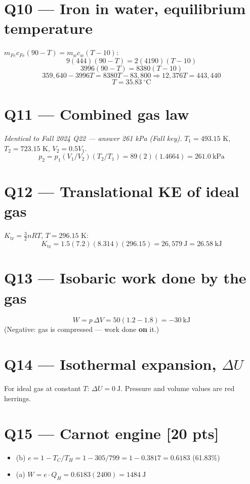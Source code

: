 \documentclass[11pt]{article}
\begin{document}
\section*{Q10 --- Iron in water, equilibrium temperature}
$m_{Fe}c_{Fe}(90-T) = m_w c_w(T-10)$:
\[ 9(444)(90-T) = 2(4190)(T-10) \]
\[ 3996(90-T) = 8380(T-10) \]
\[ 359{,}640 - 3996T = 8380T - 83{,}800 \Rightarrow 12{,}376T = 443{,}440 \]
\[ T = \boxed{35.83\ ^\circ\text{C}} \]

\section*{Q11 --- Combined gas law}
\emph{Identical to Fall 2024 Q22 --- answer 261 kPa (Fall key).} $T_1=493.15$ K, $T_2=723.15$ K, $V_2=0.5V_1$.
\[ p_2 = p_1(V_1/V_2)(T_2/T_1) = 89(2)(1.4664) = \boxed{261.0\ \text{kPa}} \]

\section*{Q12 --- Translational KE of ideal gas}
$K_{\text{tr}}=\tfrac32 nRT$, $T=296.15$ K:
\[ K_{\text{tr}} = 1.5(7.2)(8.314)(296.15) = 26{,}579\ \text{J} = \boxed{26.58\ \text{kJ}} \]

\section*{Q13 --- Isobaric work done by the gas}
\[ W = p\,\Delta V = 50(1.2-1.8) = \boxed{-30\ \text{kJ}} \]
(Negative: gas is compressed --- work done \textbf{on} it.)

\section*{Q14 --- Isothermal expansion, $\Delta U$}
For ideal gas at constant $T$: $\Delta U = \boxed{0\ \text{J}}$. Pressure and volume values are red herrings.

\section*{Q15 --- Carnot engine [20 pts]}
\begin{itemize}[leftmargin=*]
  \item (b) $e = 1 - T_C/T_H = 1 - 305/799 = 1 - 0.3817 = \boxed{0.6183}$ (61.83\%)
  \item (a) $W = e\cdot Q_H = 0.6183(2400) = \boxed{1484\ \text{J}}$
\end{itemize}
\end{document}

